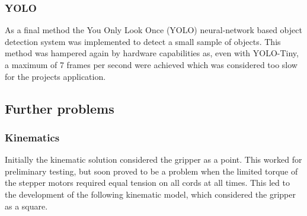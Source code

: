 \documentclass[conference]{IEEEtran}
\begin{document}
	\subsubsection{YOLO}
	As a final method the You Only Look Once (YOLO) neural-network based object detection system was implemented to detect a small sample of objects. This method was hampered again by hardware capabilities as, even with YOLO-Tiny, a maximum of 7 frames per second were achieved which was considered too slow for the projects application.\subsection{Further problems}\subsubsection{Kinematics}\label{kinematic_solution_3}
	Initially the kinematic solution considered the gripper as a point. This worked for preliminary testing, but soon proved to be a problem when the limited torque of the stepper motors required equal tension on all cords at all times. This led to the development of the following kinematic model, which considered the gripper as a square. 
	
\end{document}
